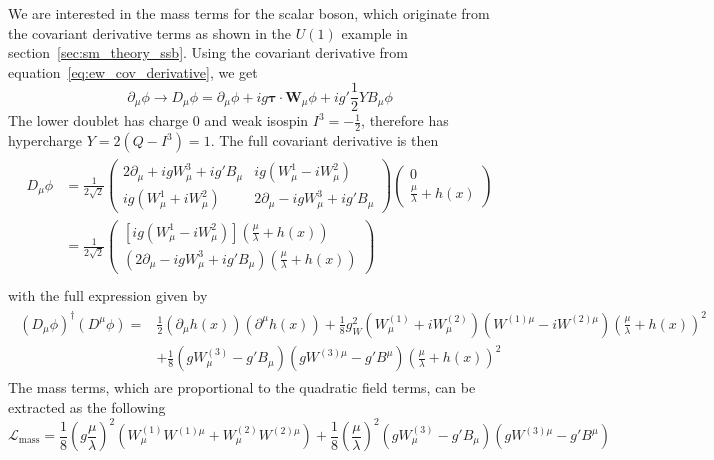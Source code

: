 We are interested in the mass terms for the scalar boson, which originate from the covariant derivative terms as shown in the $U(1)$ example in section~\ref{sec:sm_theory_ssb}. Using the covariant derivative from equation~\ref{eq:ew_cov_derivative}, we get
\begin{equation}
	\partial_\mu\phi\to D_\mu\phi=\partial_\mu\phi+ig\boldsymbol{\tau}\cdot\mathbf{W}_\mu\phi+ig'\frac{1}{2}YB_\mu\phi
\end{equation}
The lower doublet has charge 0 and weak isospin $I^3=-\frac{1}{2}$, therefore has hypercharge $Y=2(Q-I^3)=1$. The full covariant derivative is then
\begin{align}
	\begin{split}
		D_\mu\phi&=\frac{1}{2\sqrt{2}}\begin{pmatrix}2\partial_\mu+igW_\mu^3+ig'B_\mu&ig(W_\mu^1-iW_\mu^2)\\ig(W_\mu^1+iW_\mu^2)&2\partial_\mu-igW_\mu^3+ig'B_\mu\end{pmatrix}\begin{pmatrix}0\\\frac{\mu}{\lambda}+h(x)\end{pmatrix}\\
		&=\frac{1}{2\sqrt{2}}\begin{pmatrix}\left[ig(W_\mu^1-iW_\mu^2)\right]\left(\frac{\mu}{\lambda}+h(x)\right)\\\left(2\partial_\mu-igW_\mu^3+ig'B_\mu\right)\left(\frac{\mu}{\lambda}+h(x)\right)\end{pmatrix}\\
	\end{split}
\end{align}
with the full expression given by
\begin{align}
	\begin{split}
		\left(D_\mu\phi\right)^\dagger\left(D^\mu\phi\right)=&\frac{1}{2}\left(\partial_\mu h(x)\right)\left(\partial^\mu h(x)\right)+\frac{1}{8}g_W^2\left(W_\mu^{(1)}+iW_\mu^{(2)}\right)\left(W^{(1)\mu}-iW^{(2)\mu}\right)\left(\frac{\mu}{\lambda}+h(x)\right)^2\\
		&+\frac{1}{8}\left(gW_\mu^{(3)}-g'B_\mu\right)\left(gW^{(3)\mu}-g'B^\mu\right)\left(\frac{\mu}{\lambda}+h(x)\right)^2
	\end{split}
\end{align}
The mass terms, which are proportional to the quadratic field terms, can be extracted as the following
\begin{equation}
	\mathcal{L}_\text{mass}=\frac{1}{8}(g\frac{\mu}{\lambda})^2\left(W_\mu^{(1)}W^{(1)\mu}+W_\mu^{(2)}W^{(2)\mu}\right)+\frac{1}{8}\left(\frac{\mu}{\lambda}\right)^2\left(gW_\mu^{(3)}-g'B_\mu\right)\left(gW^{(3)\mu}-g'B^\mu\right)
\end{equation}
